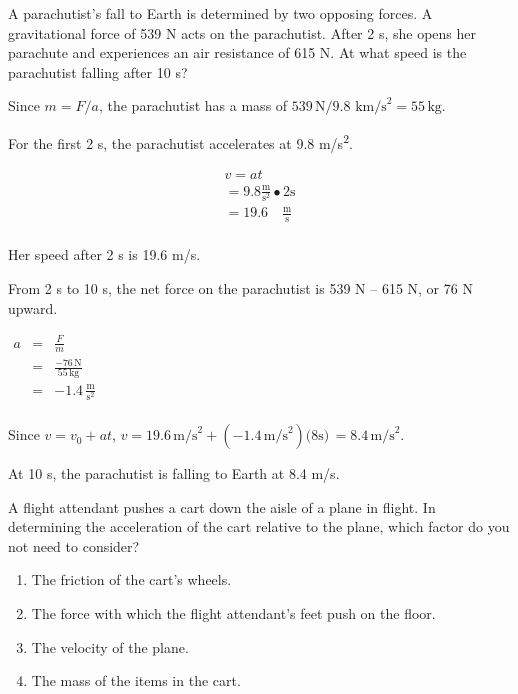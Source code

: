 \documentclass[
]{book}
\providecommand{\tightlist}{%
  \setlength{\itemsep}{0pt}\setlength{\parskip}{0pt}}
\begin{document}
\hypertarget{fs-id1651805}{}
\leavevmode{}%
A parachutist's fall to Earth is determined by two opposing forces. A
gravitational force of 539 N acts on the parachutist. After 2 s, she
opens her parachute and experiences an air resistance of 615 N. At what
speed is the parachutist falling after 10 s?

\leavevmode{}%
Since \(m = F/a\), the parachutist has a mass of
\(539\,\text{N/9}\text{.8~km/s}^{\text{2}} = 55\,\text{kg}\).

For the first 2 s, the parachutist accelerates at 9.8 m/s\textsuperscript{2}.

\[\begin{matrix}
{v = at} \\
{= 9.8\frac{\text{m}}{\text{s}^{\text{2}}} \bullet 2\text{s}} \\
{= 19.6\quad\frac{\text{m}}{\text{s}}} \\
\end{matrix}\]

Her speed after 2 s is 19.6 m/s.

From 2 s to 10 s, the net force on the parachutist is 539 N -- 615 N, or
76 N upward.

\(\begin{matrix} a & = & \frac{F}{m} \\  & = & \frac{- 76\,\text{N}}{55\,\text{kg}} \\  & = & {- 1.4\,\frac{\text{m}}{\text{s}^{2}}} \\ \end{matrix}\)

Since \(v = v_{0} + at\),
\(v = 19.6\,\text{m/s}^{\text{2}} + ( - 1.4\,\text{m/s}^{\text{2}})(8\text{s)}\, = 8.4\,\text{m/s}^{\text{2}}\).

At 10 s, the parachutist is falling to Earth at 8.4 m/s.

\hypertarget{fs-id1437308}{}
\leavevmode{}%
A flight attendant pushes a cart down the aisle of a plane in flight. In
determining the acceleration of the cart relative to the plane, which
factor do you not need to consider?

\begin{enumerate}
\def\labelenumi{\alph{enumi}.}
\tightlist
\item
  The friction of the cart's wheels.
\item
  The force with which the flight attendant's feet push on the floor.
\item
  The velocity of the plane.
\item
  The mass of the items in the cart.
\end{enumerate}
\end{document}
